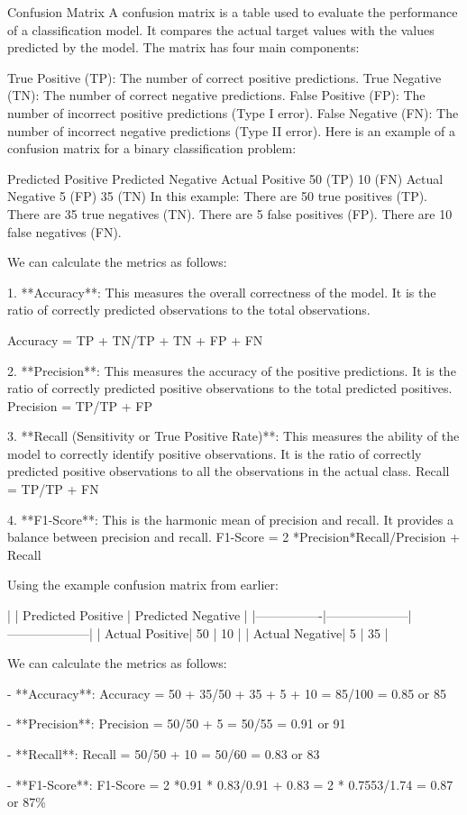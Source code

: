 Confusion Matrix
A confusion matrix is a table used to evaluate the performance of a classification model. 
It compares the actual target values with the values predicted by the model. The matrix has four main components:

True Positive (TP): The number of correct positive predictions.
True Negative (TN): The number of correct negative predictions.
False Positive (FP): The number of incorrect positive predictions (Type I error).
False Negative (FN): The number of incorrect negative predictions (Type II error).
Here is an example of a confusion matrix for a binary classification problem:

                Predicted Positive	Predicted Negative
Actual  Positive    50 (TP)	                10 (FN)
Actual Negative	    5  (FP)	                35 (TN)
In this example:
There are 50 true positives (TP).
There are 35 true negatives (TN).
There are 5 false positives (FP).
There are 10 false negatives (FN).

We can calculate the metrics as follows:


1. **Accuracy**: This measures the overall correctness of the model. It is the ratio of correctly predicted observations to the total observations.
   
   Accuracy = {TP + TN}/{TP + TN + FP + FN}
 
2. **Precision**: This measures the accuracy of the positive predictions. It is the ratio of correctly predicted positive observations to the total predicted positives.
   Precision = {TP}/{TP + FP}
   
3. **Recall (Sensitivity or True Positive Rate)**: This measures the ability of the model to correctly identify positive observations. It is the ratio of correctly predicted positive observations to all the observations in the actual class.
    {Recall} = {TP}/{TP + FN}
   
4. **F1-Score**: This is the harmonic mean of precision and recall. It provides a balance between precision and recall.
    {F1-Score} = 2 *{{Precision}*{Recall}}/{{Precision} + {Recall}}


Using the example confusion matrix from earlier:

|                | Predicted Positive | Predicted Negative |
|----------------|--------------------|--------------------|
| Actual Positive|         50         |         10         |
| Actual Negative|         5          |         35         |

We can calculate the metrics as follows:

- **Accuracy**: 
  {Accuracy} = {50 + 35}/{50 + 35 + 5 + 10} = {85}/{100} = 0.85 or 85%
  

- **Precision**: 
  {Precision} = {50}/{50 + 5} = {50}/{55} = 0.91 or 91%

- **Recall**: 
  {Recall} = {50}/{50 + 10} = {50}/{60} = 0.83 or 83%

- **F1-Score**: 
  {F1-Score} = 2 *{0.91 * 0.83}/{0.91 + 0.83} = 2 * {0.7553}/{1.74} = 0.87 or 87\%
  
